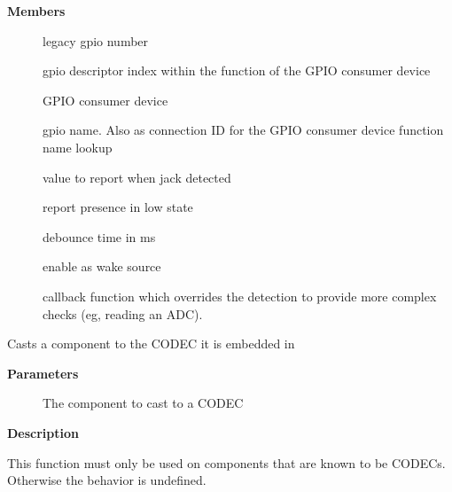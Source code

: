 \documentclass[a4paper,8pt,english]{sphinxmanual}
\begin{document}
\textbf{Members}
\begin{description}
\item[{}] \leavevmode
legacy gpio number

\item[{}] \leavevmode
gpio descriptor index within the function of the GPIO
consumer device

\item[{}] \leavevmode
GPIO consumer device

\item[{}] \leavevmode
gpio name. Also as connection ID for the GPIO consumer
device function name lookup

\item[{}] \leavevmode
value to report when jack detected

\item[{}] \leavevmode
report presence in low state

\item[{}] \leavevmode
debounce time in ms

\item[{}] \leavevmode
enable as wake source

\item[{}] \leavevmode
callback function which overrides the detection
to provide more complex checks (eg, reading an
ADC).

\end{description}

\begin{fulllineitems}
\label{sound/kernel-api/alsa-driver-api:c.snd_soc_component_to_codec}
Casts a component to the CODEC it is embedded in

\end{fulllineitems}


\textbf{Parameters}
\begin{description}
\item[{}] \leavevmode
The component to cast to a CODEC

\end{description}

\textbf{Description}

This function must only be used on components that are known to be CODECs.
Otherwise the behavior is undefined.
\end{document}

